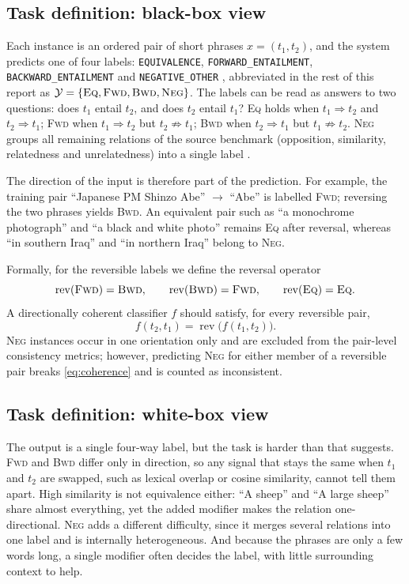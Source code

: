\documentclass[11pt,a4paper]{article}
\newcommand{\EQ}{\textsc{Eq}}
\newcommand{\FWD}{\textsc{Fwd}}
\newcommand{\BWD}{\textsc{Bwd}}
\newcommand{\NEG}{\textsc{Neg}}
\DeclareMathOperator{\rev}{rev}
\begin{document}
\subsection{Task definition: black-box view}
\label{sec:task}

Each instance is an ordered pair of short phrases $x=(t_1,t_2)$, and the system predicts one of four labels: \texttt{EQUIVALENCE}, \texttt{FORWARD\_ENTAILMENT}, \texttt{BACKWARD\_ENTAILMENT} and \texttt{NEGATIVE\_OTHER} \citep{diconli2026}, abbreviated in the rest of this report as $\mathcal{Y}=\{\EQ,\FWD,\BWD,\NEG\}$. The labels can be read as answers to two questions: does $t_1$ entail $t_2$, and does $t_2$ entail $t_1$?
\EQ{} holds when $t_1 \Rightarrow t_2$ and $t_2 \Rightarrow t_1$;
\FWD{} when $t_1 \Rightarrow t_2$ but $t_2 \not\Rightarrow t_1$;
\BWD{} when $t_2 \Rightarrow t_1$ but $t_1 \not\Rightarrow t_2$.
\NEG{} groups all remaining relations of the source benchmark (opposition, similarity, relatedness and unrelatedness) into a single label \citep{diconli2026}.

The direction of the input is therefore part of the prediction. For example, the training pair ``Japanese PM Shinzo Abe'' $\rightarrow$ ``Abe'' is labelled \FWD; reversing the two phrases yields \BWD. An equivalent pair such as ``a monochrome photograph'' and ``a black and white photo'' remains \EQ{} after reversal, whereas ``in southern Iraq'' and ``in northern Iraq'' belong to \NEG.

Formally, for the reversible labels we define the reversal operator
\begin{equation}
\rev(\FWD)=\BWD,\qquad \rev(\BWD)=\FWD,\qquad \rev(\EQ)=\EQ .
\end{equation}
A directionally coherent classifier $f$ should satisfy, for every reversible pair,
\begin{equation}
\label{eq:coherence}
f(t_2,t_1)=\rev\big(f(t_1,t_2)\big).
\end{equation}
\NEG{} instances occur in one orientation only and are excluded from the pair-level consistency metrics; however, predicting \NEG{} for either member of a reversible pair breaks \cref{eq:coherence} and is counted as inconsistent.

\subsection{Task definition: white-box view}

The output is a single four-way label, but the task is harder than that suggests. \FWD{} and \BWD{} differ only in direction, so any signal that stays the same when $t_1$ and $t_2$ are swapped, such as lexical overlap or cosine similarity, cannot tell them apart. High similarity is not equivalence either: ``A sheep'' and ``A large sheep'' share almost everything, yet the added modifier makes the relation one-directional. \NEG{} adds a different difficulty, since it merges several relations into one label and is internally heterogeneous. And because the phrases are only a few words long, a single modifier often decides the label, with little surrounding context to help.
\end{document}
